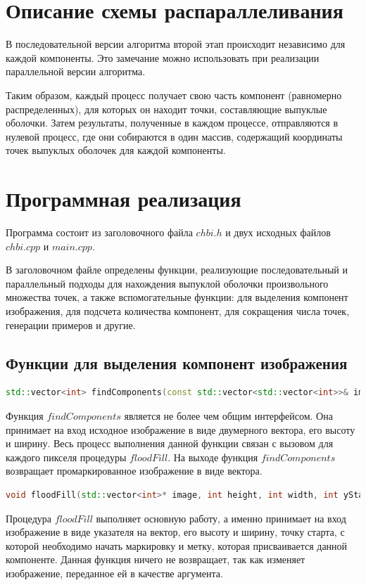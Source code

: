 \documentclass[a4paper, 12pt]{extarticle}
\newcommand{\n}{\par}
\begin{document}
	\section{Описание схемы распараллеливания}
	В последовательной версии алгоритма второй этап происходит независимо для каждой компоненты. Это замечание можно использовать при реализации параллельной версии алгоритма.\n
	Таким образом, каждый процесс получает свою часть компонент (равномерно распределенных), для которых он находит точки, составляющие выпуклые оболочки. Затем результаты, полученные в каждом процессе, отправляются в нулевой процесс, где они собираются в один массив, содержащий координаты точек выпуклых оболочек для каждой компоненты.
	\newpage
	\section{Программная реализация}
	Программа состоит из заголовочного файла $chbi.h$ и двух исходных файлов $chbi.cpp$ и $main.cpp$.\n
	В заголовочном файле определены функции, реализующие последовательный и параллельный подходы для нахождения выпуклой оболочки произвольного множества точек, а также вспомогательные функции: для выделения компонент изображения, для подсчета количества компонент, для сокращения числа точек, генерации примеров и другие.
	
	\subsection{Функции для выделения компонент изображения}
	\begin{lstlisting}[language=C++]
		std::vector<int> findComponents(const std::vector<std::vector<int>>& image, int width, int height);
	\end{lstlisting}
	Функция $findComponents$ является не более чем общим интерфейсом. Она принимает на вход исходное изображение в виде двумерного вектора, его высоту и ширину. Весь процесс выполнения данной функции связан с вызовом для каждого пикселя процедуры $floodFill$. На выходе функция $findComponents$ возвращает промаркированное изображение в виде вектора.
	\begin{lstlisting}[language=C++]
		void floodFill(std::vector<int>* image, int height, int width, int yStart, int xStart, int label);
	\end{lstlisting}
	Процедура $floodFill$ выполняет основную работу, а именно принимает на вход изображение в виде указателя на вектор, его высоту и ширину, точку старта, с которой необходимо начать маркировку и метку, которая присваивается данной компоненте. Данная функция ничего не возвращает, так как изменяет изображение, переданное ей в качестве аргумента.
	
\end{document}
